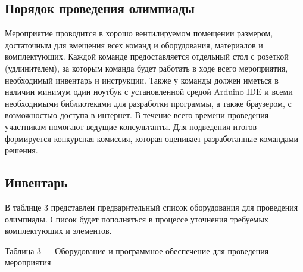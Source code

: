 \begin{longtable}{|c|p{6cm}|p{8cm}|}
\end{longtable}

\subsection*{Порядок проведения олимпиады}

Мероприятие проводится в хорошо вентилируемом помещении размером, достаточным для вмещения всех команд и оборудования, материалов и комплектующих. Каждой команде предоставляется отдельный стол с розеткой (удлинителем), за которым команда будет работать в ходе всего мероприятия, необходимый инвентарь и инструкции. Также у команды должен иметься в наличии минимум один ноутбук с установленной средой Arduino IDE и всеми необходимыми библиотеками для разработки программы, а также браузером, с возможностью доступа в интернет. В течение всего времени проведения участникам помогают ведущие-консультанты. Для подведения итогов формируется конкурсная комиссия, которая оценивает разработанные командами решения.

\subsection*{Инвентарь}

В таблице 3 представлен предварительный список оборудования для проведения олимпиады. Список будет пополняться в процессе уточнения требуемых комплектующих и элементов.


Таблица 3 — Оборудование и программное обеспечение для проведения мероприятия

